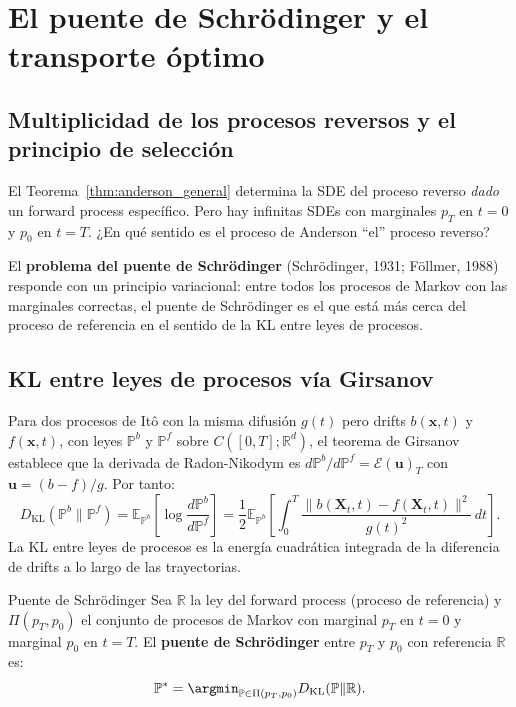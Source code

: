 \section{El puente de Schrödinger y el transporte óptimo}
\label{sec:schrodinger}

\subsection{Multiplicidad de los procesos reversos y el principio de selección}
\label{subsec:multiplicidad}

El Teorema~\ref{thm:anderson_general} determina la SDE del proceso reverso
\textit{dado} un forward process específico. Pero hay infinitas SDEs con
marginales $p_T$ en $t=0$ y $p_0$ en $t=T$. ¿En qué sentido es el proceso de
Anderson ``el'' proceso reverso?

El \textbf{problema del puente de Schrödinger} (Schrödinger, 1931; Föllmer,
1988) responde con un principio variacional: entre todos los procesos de Markov
con las marginales correctas, el puente de Schrödinger es el que está más
cerca del proceso de referencia en el sentido de la KL entre leyes de procesos.

\subsection{KL entre leyes de procesos vía Girsanov}
\label{subsec:kl_procesos}

Para dos procesos de Itô con la misma difusión $g(t)$ pero drifts $b(\bm{x},t)$
y $f(\bm{x},t)$, con leyes $\mathbb{P}^b$ y $\mathbb{P}^f$ sobre
$C([0,T];\mathbb{R}^d)$, el teorema de Girsanov establece que la derivada de
Radon-Nikodym es $d\mathbb{P}^b/d\mathbb{P}^f = \mathcal{E}(\bm{u})_T$ con
$\bm{u} = (b-f)/g$. Por tanto:
\begin{equation}
  D_{\mathrm{KL}}(\mathbb{P}^b\|\mathbb{P}^f)
  = \mathbb{E}_{\mathbb{P}^b}\!\left[\log\frac{d\mathbb{P}^b}{d\mathbb{P}^f}\right]
  = \frac{1}{2}\mathbb{E}_{\mathbb{P}^b}\!\left[
    \int_0^T \frac{\|b(\bm{X}_t,t)-f(\bm{X}_t,t)\|^2}{g(t)^2}\,dt
  \right].
  \label{eq:kl_procesos}
\end{equation}
La KL entre leyes de procesos es la energía cuadrática integrada de la
diferencia de drifts a lo largo de las trayectorias.

\begin{definicion}{Puente de Schrödinger}
\label{def:schrodinger}
Sea $\mathbb{R}$ la ley del forward process (proceso de referencia) y
$\Pi(p_T, p_0)$ el conjunto de procesos de Markov con marginal $p_T$ en $t=0$
y marginal $p_0$ en $t=T$. El \textbf{puente de Schrödinger} entre $p_T$ y
$p_0$ con referencia $\mathbb{R}$ es:
\begin{equation}
  \mathbb{P}^* = \argmin_{\mathbb{P}\in\Pi(p_T,p_0)} D_{\mathrm{KL}}(\mathbb{P}\|\mathbb{R}).
  \label{eq:schrodinger_problem}
\end{equation}
\end{definicion}

